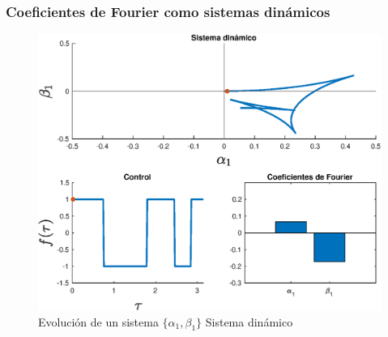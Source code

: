 \begin{frame}
    \frametitle{Coeficientes de Fourier como sistemas dinámicos}
    \begin{figure}
        \includegraphics[scale=0.4]{imgs/S0001.eps}
        \caption{Evolución de un sistema $\{\alpha_1,\beta_1\}$ Sistema dinámico}
    \end{figure}
\end{frame}


